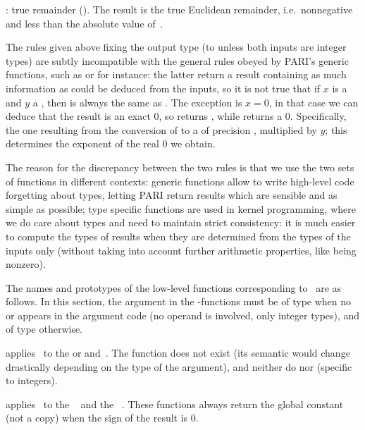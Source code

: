 \item {}: true remainder (). The result is the true
Euclidean remainder, i.e.~nonnegative and less than the absolute value
of~.

 The rules given above fixing the output
type (to  unless both inputs are integer types) are subtly
incompatible with the general rules obeyed by PARI's generic functions, such
as  or  for instance: the latter return a result
containing as much information as could be deduced from the inputs, so it is
not true that if $x$ is a  and $y$ a , then
 is always the same as . The exception
is $x = 0$, in that case we can deduce that the result is an exact $0$,
so  returns , while  returns a
 $0$. Specifically, the one resulting from the conversion of
 to a  of precision , multiplied by
$y$; this determines the exponent of the real $0$ we obtain.

The reason for the discrepancy between the two rules is that we use the two
sets of functions in different contexts: generic functions allow to write
high-level code forgetting about types, letting PARI return results which are
sensible and as simple as possible; type specific functions are used in
kernel programming, where we do care about types and need to maintain strict
consistency: it is much easier to compute the types of results when they are
determined from the types of the inputs only (without taking into account
further arithmetic properties, like being nonzero).
\smallskip

The names and prototypes of the low-level functions corresponding
to \op\ are as follows. In this section, the  argument in the
-functions must be of type  when no  or 
appears in the argument code (no  operand is involved, only integer
types), and of type  otherwise.

 applies \op\ to
the  or   and~. The function
 does not exist (its semantic would change drastically
depending on the type of the  argument), and neither do
 nor  (specific to integers).

 applies \op\ to the
~ and the ~.
 These functions always return the global constant
 (not a copy) when the sign of the result is $0$.

